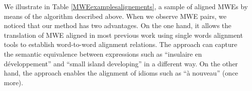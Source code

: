 \documentclass[output=paper,modfonts,nonflat]{langsci/langscibook}
\begin{document}
We illustrate in Table \ref{MWEexamplesalignements}, a sample of aligned MWEs by means of the algorithm described above.  When we observe MWE pairs, we noticed that our method has two advantages. On the one hand, it allows the translation of MWE aligned in most previous work \citep{dagan1994termight,ren2009improving} using single words alignment tools to establish word-to-word alignment relations. 
The approach can capture the semantic equivalence between expressions such as ``insulaire en développement'' and ``small island developing'' in a different way.
 On the other hand, the approach enables the alignment of idioms such as ``à nouveau'' (once more). 

\end{document}
